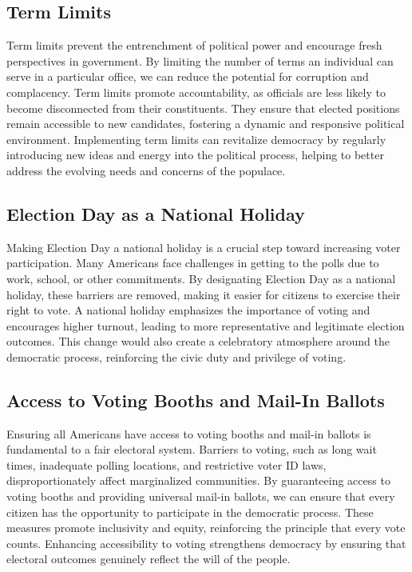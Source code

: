 \subsection{Term Limits}\label{subsec:term-limits}
Term limits prevent the entrenchment of political power and encourage fresh perspectives in government.
By limiting the number of terms an individual can serve in a particular office, we can reduce the potential for corruption and complacency.
Term limits promote accountability, as officials are less likely to become disconnected from their constituents.
They ensure that elected positions remain accessible to new candidates, fostering a dynamic and responsive political environment.
Implementing term limits can revitalize democracy by regularly introducing new ideas and energy into the political process, helping to better address the evolving needs and concerns of the populace.

\subsection{Election Day as a National Holiday}\label{subsec:election-day-as-a-national-holiday}
Making Election Day a national holiday is a crucial step toward increasing voter participation.
Many Americans face challenges in getting to the polls due to work, school, or other commitments.
By designating Election Day as a national holiday, these barriers are removed, making it easier for citizens to exercise their right to vote.
A national holiday emphasizes the importance of voting and encourages higher turnout, leading to more representative and legitimate election outcomes.
This change would also create a celebratory atmosphere around the democratic process, reinforcing the civic duty and privilege of voting.

\subsection{Access to Voting Booths and Mail-In Ballots}\label{subsec:access-to-voting-booths-and-mail-in-ballots}
Ensuring all Americans have access to voting booths and mail-in ballots is fundamental to a fair electoral system.
Barriers to voting, such as long wait times, inadequate polling locations, and restrictive voter ID laws, disproportionately affect marginalized communities.
By guaranteeing access to voting booths and providing universal mail-in ballots, we can ensure that every citizen has the opportunity to participate in the democratic process.
These measures promote inclusivity and equity, reinforcing the principle that every vote counts.
Enhancing accessibility to voting strengthens democracy by ensuring that electoral outcomes genuinely reflect the will of the people.


